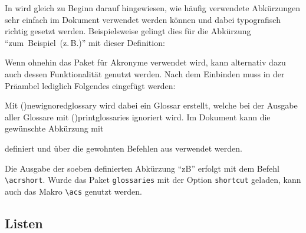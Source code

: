 \documentclass[%
  english,ngerman,%
  cdgeometry=no,DIV=12,%
  cd=false,cdfont=false,cdtitle=true,%
  headings=normal,%
  automark,%
  listof=toc,%
]{tudscrartcl}
\newcommand*\newabbreviation[4][]{%
    \newacronym[type=abbreviation,#1]{#2}{#3}{#4}%
  }%
\begin{document}
In \cite{struckmann2007} wird gleich zu Beginn darauf hingewiesen, wie häufig 
verwendete Abkürzungen sehr einfach im Dokument verwendet werden können und 
dabei typografisch richtig gesetzt werden. Beispielsweise gelingt dies für die 
Abkürzung \enquote{zum~Beispiel~(z.\,B.)} mit dieser Definition:
%
\begin{Hint}
\newcommand{\zB}{\mbox{z.\,B.}\xspace}
\end{Hint}
%
Wenn ohnehin das Paket  für Akronyme verwendet wird, kann 
alternativ dazu auch dessen Funktionalität genutzt werden. Nach dem Einbinden 
muss in der Präambel lediglich Folgendes eingefügt werden:
%
\begin{Hint}
  \newcommand*{\newabbreviation}[4][]{%
    \newacronym[type=abbreviation,#1]{#2}{\mbox{#3\xspace}}{#4}%
  }%
\end{Hint}
%
Mit \Macro(){newignoredglossary} wird dabei ein Glossar 
erstellt, welche bei der Ausgabe aller Glossare mit 
\Macro(){printglossaries} ignoriert wird. Im Dokument kann 
die gewünschte Abkürzung mit 
%
\CodeHook{\renewcommand*\newglossaryentry[2]{}}
\begin{Hint*}
\newabbreviation{zB}{z.\,B.}{zum Beispiel}
\end{Hint*}
%
definiert und über die gewohnten Befehlen aus  verwendet 
werden.
%
\begin{Hint*}
Die Ausgabe der soeben definierten Abkürzung \enquote{\acrshort{zB}}
erfolgt mit dem Befehl \texttt{\textbackslash acrshort}. Wurde das
Paket \texttt{glossaries} mit der Option \texttt{shortcut} geladen, 
kann auch das Makro \texttt{\textbackslash acs} genutzt werden.
\end{Hint*}



\subsection{%
  Listen%
  \label{sec:lists}%
}
\end{document}
